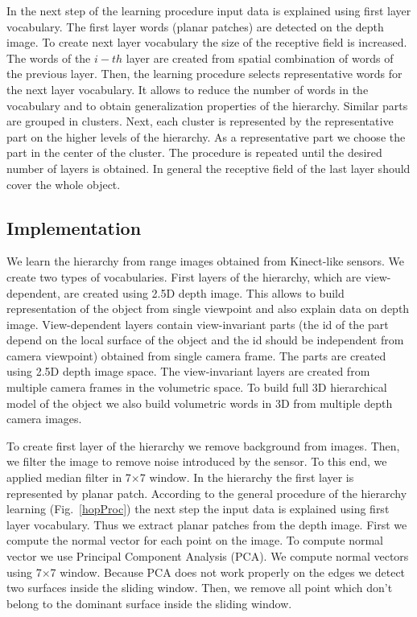 \documentclass[letterpaper,10pt,conference]{ieeeconf}  %
\begin{document}
In the next step of the learning procedure input data is explained using first layer vocabulary. The first layer words (planar patches) are detected on the depth image. To create next layer vocabulary the size of the receptive field is increased. The words of the $i-th$ layer are created from spatial combination of words of the previous layer. Then, the learning procedure selects representative words for the next layer vocabulary. It allows to reduce the number of words in the vocabulary and to obtain generalization properties of the hierarchy. Similar parts are grouped in clusters. Next, each cluster is represented by the representative part on the higher levels of the hierarchy. As a representative part we choose the part in the center of the cluster. The procedure is repeated until the desired number of layers is obtained. In general the receptive field of the last layer should cover the whole object.

\subsection{Implementation}

We learn the hierarchy from range images obtained from Kinect-like sensors. We create two types of vocabularies. First layers of the hierarchy, which are view-dependent, are created using 2.5D depth image. This allows to build representation of the object from single viewpoint and also explain data on depth image. View-dependent layers contain view-invariant parts (the id of the part depend on the local surface of the object and the id should be independent from camera viewpoint) obtained from single camera frame. The parts are created using 2.5D depth image space. The view-invariant layers are created from multiple camera frames in the volumetric space. To build full 3D hierarchical model of the object we also build volumetric words in 3D from multiple depth camera images. 

To create first layer of the hierarchy we remove background from images. Then, we filter the image to remove noise introduced by the sensor. To this end, we applied median filter in 7$\times$7 window. In the hierarchy the first layer is represented by planar patch. According to the general procedure of the hierarchy learning (Fig.~\ref{hopProc}) the next step the input data is explained using first layer vocabulary. Thus we extract planar patches from the depth image. First we compute the normal vector for each point on the image. To compute normal vector we use Principal Component Analysis (PCA). We compute normal vectors using 7$\times$7 window. Because PCA does not work properly on the edges we detect two surfaces inside the sliding window. Then, we remove all point which don't belong to the dominant surface inside the sliding window.
\end{document}
